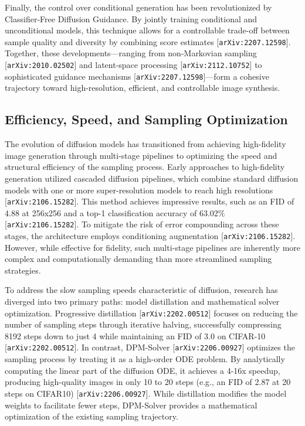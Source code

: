 \documentclass[11pt]{article}
\begin{document}
Finally, the control over conditional generation has been revolutionized by Classifier-Free Diffusion Guidance. By jointly training conditional and unconditional models, this technique allows for a controllable trade-off between sample quality and diversity by combining score estimates [\texttt{arXiv:2207.12598}]. Together, these developments—ranging from non-Markovian sampling [\texttt{arXiv:2010.02502}] and latent-space processing [\texttt{arXiv:2112.10752}] to sophisticated guidance mechanisms [\texttt{arXiv:2207.12598}]—form a cohesive trajectory toward high-resolution, efficient, and controllable image synthesis.

\subsection{Efficiency, Speed, and Sampling Optimization}

The evolution of diffusion models has transitioned from achieving high-fidelity image generation through multi-stage pipelines to optimizing the speed and structural efficiency of the sampling process. Early approaches to high-fidelity generation utilized cascaded diffusion pipelines, which combine standard diffusion models with one or more super-resolution models to reach high resolutions [\texttt{arXiv:2106.15282}]. This method achieves impressive results, such as an FID of 4.88 at 256x256 and a top-1 classification accuracy of 63.02\% [\texttt{arXiv:2106.15282}]. To mitigate the risk of error compounding across these stages, the architecture employs conditioning augmentation [\texttt{arXiv:2106.15282}]. However, while effective for fidelity, such multi-stage pipelines are inherently more complex and computationally demanding than more streamlined sampling strategies.

To address the slow sampling speeds characteristic of diffusion, research has diverged into two primary paths: model distillation and mathematical solver optimization. Progressive distillation [\texttt{arXiv:2202.00512}] focuses on reducing the number of sampling steps through iterative halving, successfully compressing 8192 steps down to just 4 while maintaining an FID of 3.0 on CIFAR-10 [\texttt{arXiv:2202.00512}]. In contrast, DPM-Solver [\texttt{arXiv:2206.00927}] optimizes the sampling process by treating it as a high-order ODE problem. By analytically computing the linear part of the diffusion ODE, it achieves a 4-16x speedup, producing high-quality images in only 10 to 20 steps (e.g., an FID of 2.87 at 20 steps on CIFAR10) [\texttt{arXiv:2206.00927}]. While distillation modifies the model weights to facilitate fewer steps, DPM-Solver provides a mathematical optimization of the existing sampling trajectory.
\end{document}
